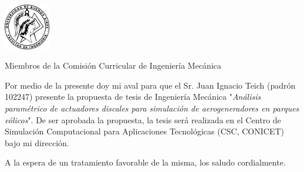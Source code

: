 \documentclass{letter}
\newcommand{\thesisname}{Análisis paramétrico de actuadores discales para simulación de aerogeneradores en parques eólicos}
\begin{document}
\begin{letter}{\includegraphics[width=0.15\textwidth]{Logo-fiuba.png}\hfill}

\opening{Miembros de la Comisión Curricular de Ingeniería Mecánica}
Por medio de la presente doy mi aval para que el Sr. Juan Ignacio Teich (padrón 102247) presente la propuesta de tesis de Ingeniería Mecánica "\textit{\thesisname}".  De ser aprobada la propuesta, la tesis será realizada en el Centro de Simulación Computacional para Aplicaciones Tecnológicas (CSC, CONICET) bajo mi dirección.
\closing{A la espera de un tratamiento favorable de la misma, los saludo cordialmente.}
\end{letter}
\end{document}
